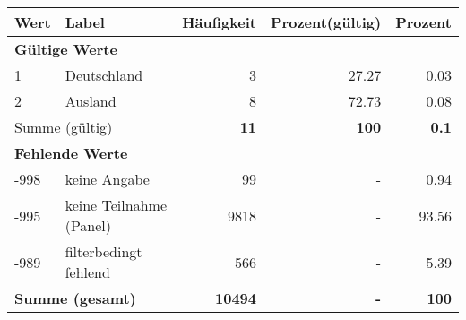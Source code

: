      \begin{longtable}{lXrrr}
     \toprule
     \textbf{Wert} & \textbf{Label} & \textbf{Häufigkeit} & \textbf{Prozent(gültig)} & \textbf{Prozent} \\
     \endhead
     \midrule
     \multicolumn{5}{l}{\textbf{Gültige Werte}}\\

     1 &
     \multicolumn{1}{X}{ Deutschland   } &


       \num{3} &
       \num[round-mode=places,round-precision=2]{27,27} &
         \num[round-mode=places,round-precision=2]{0,03} \\

     2 &
     \multicolumn{1}{X}{ Ausland   } &


       \num{8} &
       \num[round-mode=places,round-precision=2]{72,73} &
         \num[round-mode=places,round-precision=2]{0,08} \\
     \midrule
     \multicolumn{2}{l}{Summe (gültig)} &
       \textbf{\num{11}} &
     \textbf{100} &
       \textbf{\num[round-mode=places,round-precision=2]{0,1}} \\
     \multicolumn{5}{l}{\textbf{Fehlende Werte}}\\
       -998 &
       keine Angabe &
         \num{99} &
        - &
         \num[round-mode=places,round-precision=2]{0,94} \\
       -995 &
       keine Teilnahme (Panel) &
         \num{9818} &
        - &
         \num[round-mode=places,round-precision=2]{93,56} \\
       -989 &
       filterbedingt fehlend &
         \num{566} &
        - &
         \num[round-mode=places,round-precision=2]{5,39} \\
     \midrule
     \multicolumn{2}{l}{\textbf{Summe (gesamt)}} &
          \textbf{\num{10494}} &
        \textbf{-} &
        \textbf{100} \\
     \bottomrule
     \end{longtable}
     

